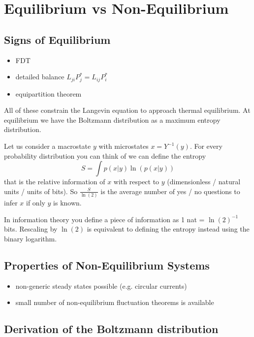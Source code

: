 \documentclass{notebook}
\begin{document}
\newpage

\section{Equilibrium vs Non-Equilibrium}

\subsection*{Signs of Equilibrium}

\begin{itemize}
	\item FDT
	\item detailed balance $L_{ji}P_j^* = L_{ij}P_i^*$
	\item equipartition theorem
\end{itemize}

All of these constrain the Langevin equation to approach thermal equilibrium. At equilibrium we have the Boltzmann distribution as a maximum entropy distribution. 

Let us consider a macrostate $y$ with microstates $x = Y^{-1}(y)$. For every probability distribution you can think of we can define the entropy
%
\begin{equation}
	S = \int p(x|y) \ln(p(x|y))
\end{equation}
%
that is the relative information of $x$ with respect to $y$ (dimensionless / natural units / units of bits). So $\frac{S}{\ln(2)}$ is the average number of yes / no questions to infer $x$ if only $y$ is known.

In information theory you define a piece of information as 1 nat = $\ln(2)^{-1}$ bits. Rescaling by $\ln(2)$ is equivalent to defining the entropy instead using the binary logarithm.

\subsection*{Properties of Non-Equilibrium Systems}

\begin{itemize}
	\item non-generic steady states possible (e.g. circular currents)
	\item small number of non-equilibrium fluctuation theorems is available
\end{itemize}

\subsection*{Derivation of the Boltzmann distribution}
\end{document}
